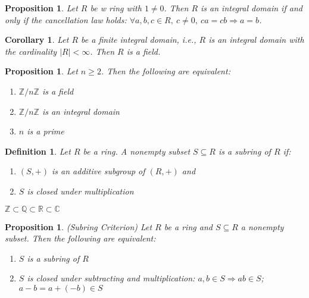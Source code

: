 \documentclass[a4paper,sfsidenotes,openany]{tufte-book}
\theoremstyle{theorem}
\newtheorem{corollary}[theorem]{Corollary}
\newtheorem{proposition}[theorem]{Proposition}
\newtheorem{definition}[theorem]{Definition}
\begin{document}
\begin{fullwidth}
\begin{proposition}
Let $R$ be w ring with $1 \neq 0$. Then $R$ is an integral domain if and only if the cancellation law holds: $\forall a, b, c \in R, \ c \neq 0, \ ca=cb \Rightarrow a=b$.\\	
\end{proposition}
\>

\begin{corollary}
Let $R$ be a finite integral domain, i.e., $R$ is an integral domain with the cardinality $\left| R \right| < \infty$. Then $R$ is a field.\\
\end{corollary}
\>

\begin{proposition}
Let $n \geq 2$. Then the following are equivalent:
\begin{enumerate}[label=(\roman*),leftmargin=0pt, itemindent=4em, align=left]
\item $\mathbb{Z}/n\mathbb{Z}$ is a field
\item $\mathbb{Z}/n\mathbb{Z}$ is an integral domain
\item $n$ is a prime
\end{enumerate}
\end{proposition}
\>

\begin{definition}
Let $R$ be a ring. A nonempty subset $S \subseteq R$ is a \textit{{\color{blue} subring}} of $R$ if:
\begin{enumerate}[label=(\roman*),leftmargin=0pt, itemindent=4em, align=left]
\item $(S, +)$ is an additive subgroup of $(R, +)$ and
\item $S$ is closed under multiplication
\end{enumerate}
$\mathbb{Z} \subset \mathbb{Q} \subset \mathbb{R} \subset \mathbb{C} $
\end{definition}
\>

\begin{proposition}
\textit{{\color{blue} (Subring Criterion)}} Let $R$ be a ring and $S \subseteq R$ a nonempty subset. Then the following are equivalent:
\begin{enumerate}[label=(\roman*),leftmargin=0pt, itemindent=4em, align=left]
\item $S$ is a subring of $R$
\item $S$ is closed under subtracting and multiplication: $a,b\in S \Rightarrow ab\in S$; $a-b = a + (-b) \in S$
\end{enumerate}
\end{proposition}
\>


\end{fullwidth}
\end{document}
